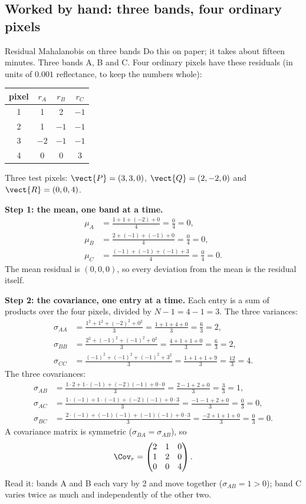 \subsection{Worked by hand: three bands, four ordinary pixels}

\begin{worked}[label={we:residualmaha:three}]{Residual Mahalanobis on three bands}
Do this on paper; it takes about fifteen minutes. Three bands A, B and C. Four ordinary pixels have these
residuals (in units of $0.001$ reflectance, to keep the numbers whole):
\begin{center}
\begin{tabular}{@{}cccc@{}}
\toprule
pixel & $r_A$ & $r_B$ & $r_C$\\
\midrule
1 & 1 & 2 & $-1$\\
2 & 1 & $-1$ & $-1$\\
3 & $-2$ & $-1$ & $-1$\\
4 & 0 & 0 & 3\\
\bottomrule
\end{tabular}
\end{center}
Three test pixels: $\vect{P}=(3,3,0)$, $\vect{Q}=(2,-2,0)$ and $\vect{R}=(0,0,4)$.

\textbf{Step 1: the mean, one band at a time.}
\begin{align*}
\mu_A &= \frac{1+1+(-2)+0}{4} = \frac{0}{4} = 0,\\
\mu_B &= \frac{2+(-1)+(-1)+0}{4} = \frac{0}{4} = 0,\\
\mu_C &= \frac{(-1)+(-1)+(-1)+3}{4} = \frac{0}{4} = 0.
\end{align*}
The mean residual is $(0,0,0)$, so every deviation from the mean is the residual itself.

\textbf{Step 2: the covariance, one entry at a time.} Each entry is a sum of products over the four pixels,
divided by $N-1=4-1=3$. The three variances:
\begin{align*}
\sigma_{AA} &= \frac{1^2+1^2+(-2)^2+0^2}{3} = \frac{1+1+4+0}{3} = \frac{6}{3} = 2,\\
\sigma_{BB} &= \frac{2^2+(-1)^2+(-1)^2+0^2}{3} = \frac{4+1+1+0}{3} = \frac{6}{3} = 2,\\
\sigma_{CC} &= \frac{(-1)^2+(-1)^2+(-1)^2+3^2}{3} = \frac{1+1+1+9}{3} = \frac{12}{3} = 4.
\end{align*}
The three covariances:
\begin{align*}
\sigma_{AB} &= \frac{1\cdot2+1\cdot(-1)+(-2)(-1)+0\cdot0}{3} = \frac{2-1+2+0}{3} = \frac{3}{3} = 1,\\
\sigma_{AC} &= \frac{1\cdot(-1)+1\cdot(-1)+(-2)(-1)+0\cdot3}{3} = \frac{-1-1+2+0}{3} = \frac{0}{3} = 0,\\
\sigma_{BC} &= \frac{2\cdot(-1)+(-1)(-1)+(-1)(-1)+0\cdot3}{3} = \frac{-2+1+1+0}{3} = \frac{0}{3} = 0.
\end{align*}
A covariance matrix is symmetric ($\sigma_{BA}=\sigma_{AB}$), so
\[
\Cov_r=\begin{pmatrix}2&1&0\\1&2&0\\0&0&4\end{pmatrix}.
\]
Read it: bands A and B each vary by 2 and move together ($\sigma_{AB}=1>0$); band C varies twice as much and
independently of the other two.


\end{worked}
